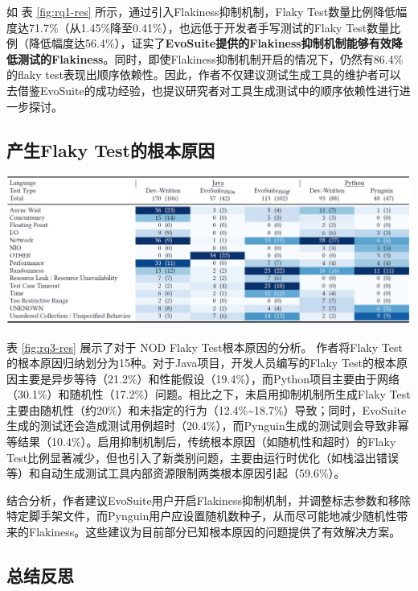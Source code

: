 \documentclass{article}
\newcommand{\flakyTest}{Flaky Test}
\begin{document}
如 表 \ref{fig:rq1-res} 所示，通过引入Flakiness抑制机制，\flakyTest 数量比例降低幅度达71.7\%（从1.45\%降至0.41\%），也远低于开发者手写测试的\flakyTest 数量比例（降低幅度达56.4\%），证实了\textbf{EvoSuite提供的Flakiness抑制机制能够有效降低测试的Flakiness}。同时，即使Flakiness抑制机制开启的情况下，仍然有86.4\%的flaky test表现出顺序依赖性。因此，作者不仅建议测试生成工具的维护者可以去借鉴EvoSuite的成功经验，也提议研究者对工具生成测试中的顺序依赖性进行进一步探讨。

\subsection{产生\flakyTest 的根本原因}
    
\begin{table}[H]
\centering
\includegraphics[width=\textwidth]{img/RQ3_res.png}
\caption{对于 NOD \flakyTest 根本原因的分析}
\label{fig:rq3-res}
\end{table}

表 \ref{fig:rq3-res} 展示了对于 NOD \flakyTest 根本原因的分析。
作者将\flakyTest 的根本原因归纳划分为15种。对于Java项目，开发人员编写的\flakyTest 的根本原因主要是异步等待（21.2\%）和性能假设（19.4\%），而Python项目主要由于网络（30.1\%）和随机性（17.2\%）问题。相比之下，未启用抑制机制所生成\flakyTest 主要由随机性（约20\%）和未指定的行为（12.4\%\textasciitilde18.7\%）导致；同时，EvoSuite生成的测试还会造成测试用例超时（20.4\%），而Pynguin生成的测试则会导致非幂等结果（10.4\%）。启用抑制机制后，传统根本原因（如随机性和超时）的\flakyTest 比例显著减少，但也引入了新类别问题，主要由运行时优化（如栈溢出错误等）和自动生成测试工具内部资源限制两类根本原因引起（59.6\%）。

结合分析，作者建议EvoSuite用户开启Flakiness抑制机制，并调整标志参数和移除特定脚手架文件，而Pynguin用户应设置随机数种子，从而尽可能地减少随机性带来的Flakiness。这些建议为目前部分已知根本原因的问题提供了有效解决方案。

\subsection{总结反思}
\end{document}
